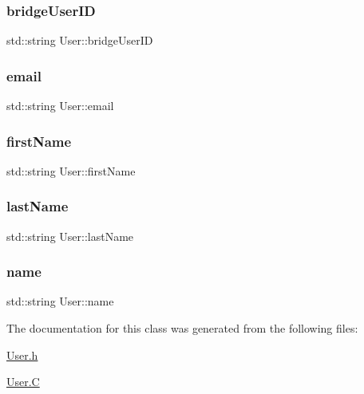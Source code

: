 \mbox{\label{class_user_aab2b993a0e6512bed3f637338f48d9ac}} 
\subsubsection{\texorpdfstring{bridge\+User\+ID}{bridgeUserID}}
{\footnotesize\ttfamily std\+::string User\+::bridge\+User\+ID}

\mbox{\label{class_user_ac35b7c63228119cb91acdbd7ed32b8cb}} 
\subsubsection{\texorpdfstring{email}{email}}
{\footnotesize\ttfamily std\+::string User\+::email}

\mbox{\label{class_user_aa845739b31aaf9d2e7bdedf829447191}} 
\subsubsection{\texorpdfstring{first\+Name}{firstName}}
{\footnotesize\ttfamily std\+::string User\+::first\+Name}

\mbox{\label{class_user_a10abe0efedb0a600a7be16593a448b12}} 
\subsubsection{\texorpdfstring{last\+Name}{lastName}}
{\footnotesize\ttfamily std\+::string User\+::last\+Name}

\mbox{\label{class_user_a085d8d69282b6298964eab8351584536}} 
\subsubsection{\texorpdfstring{name}{name}}
{\footnotesize\ttfamily std\+::string User\+::name}



The documentation for this class was generated from the following files\+:\begin{DoxyCompactItemize}
\item 
\hyperlink{_user_8h}{User.\+h}\item 
\hyperlink{_user_8_c}{User.\+C}\end{DoxyCompactItemize}
